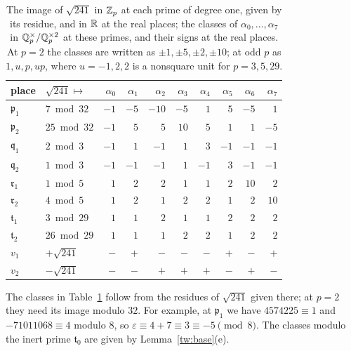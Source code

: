\begin{table}[htbp]
\centering
\caption{The image of $\sqrt{241}$ in $\mathbb Z_p$ at each prime of degree one,
given by its residue, and in $\mathbb R$ at the real places; the classes of
$\alpha_0,\dots,\alpha_7$ in $\mathbb Q_p^\times/\mathbb Q_p^{\times2}$ at these primes, and
their signs at the real places. At $p=2$ the classes are written as
$\pm1,\pm5,\pm2,\pm10$; at odd $p$ as $1,u,p,up$, where $u=-1,2,2$ is a
nonsquare unit for $p=3,5,29$.}
\label{tw:squareclass-table}
\begin{tabular}{llrrrrrrrr}
\toprule
place & $\sqrt{241}\mapsto$ & $\alpha_0$ & $\alpha_1$ & $\alpha_2$ & $\alpha_3$ & $\alpha_4$ & $\alpha_5$ & $\alpha_6$ & $\alpha_7$\\
\midrule
$\mathfrak p_1$ & $7\bmod 32$ & $-1$ & $-5$ & $-10$ & $-5$ & $1$ & $5$ & $-5$ & $1$\\
$\mathfrak p_2$ & $25\bmod 32$ & $-1$ & $5$ & $5$ & $10$ & $5$ & $1$ & $1$ & $-5$\\
$\mathfrak q_1$ & $2\bmod 3$ & $-1$ & $1$ & $-1$ & $1$ & $3$ & $-1$ & $-1$ & $-1$\\
$\mathfrak q_2$ & $1\bmod 3$ & $-1$ & $-1$ & $-1$ & $1$ & $-1$ & $3$ & $-1$ & $-1$\\
$\mathfrak r_1$ & $1\bmod 5$ & $1$ & $2$ & $2$ & $1$ & $1$ & $2$ & $10$ & $2$\\
$\mathfrak r_2$ & $4\bmod 5$ & $1$ & $2$ & $1$ & $2$ & $2$ & $1$ & $2$ & $10$\\
$\mathfrak t_1$ & $3\bmod 29$ & $1$ & $1$ & $2$ & $1$ & $1$ & $2$ & $2$ & $2$\\
$\mathfrak t_2$ & $26\bmod 29$ & $1$ & $1$ & $1$ & $2$ & $2$ & $1$ & $2$ & $2$\\
$v_1$ & $+\sqrt{241}$ & $-$ & $+$ & $-$ & $-$ & $-$ & $+$ & $-$ & $+$\\
$v_2$ & $-\sqrt{241}$ & $-$ & $-$ & $+$ & $+$ & $+$ & $-$ & $+$ & $-$\\
\bottomrule
\end{tabular}
\end{table}

The classes in Table~\ref{tw:squareclass-table} follow from the residues of
$\sqrt{241}$ given there; at $p=2$ they need its image modulo $32$. For
example, at $\mathfrak p_1$ we have $4574225\equiv1$ and $-71011068\equiv4$
modulo $8$, so $\varepsilon\equiv4+7\equiv3\equiv-5\pmod 8$. The classes
modulo the inert prime $\mathfrak t_0$ are given by Lemma~\ref{tw:base}(e).

